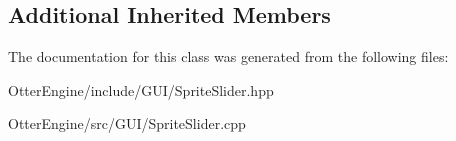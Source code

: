 \subsection*{Additional Inherited Members}


The documentation for this class was generated from the following files\+:\begin{DoxyCompactItemize}
\item 
Otter\+Engine/include/\+G\+U\+I/Sprite\+Slider.\+hpp\item 
Otter\+Engine/src/\+G\+U\+I/Sprite\+Slider.\+cpp\end{DoxyCompactItemize}
